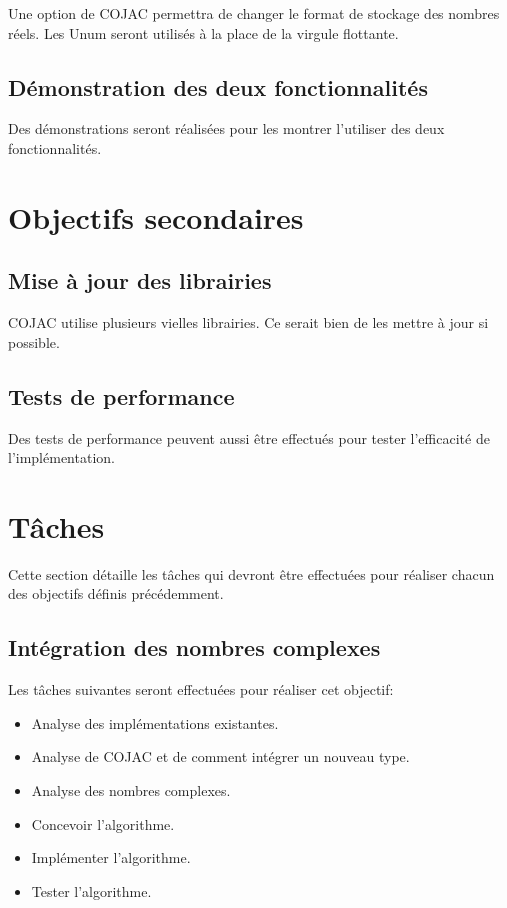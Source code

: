 Une option de COJAC permettra de changer le format de stockage des nombres réels. Les Unum seront utilisés à la place de la virgule flottante.

\subsection{Démonstration des deux fonctionnalités}

Des démonstrations seront réalisées pour les montrer l'utiliser des deux fonctionnalités.

\section{Objectifs secondaires}


\subsection{Mise à jour des librairies}

COJAC \cite{COJAC} utilise plusieurs vielles librairies. Ce serait bien de les mettre à jour si possible.

\subsection{Tests de performance}

Des tests de performance peuvent aussi être effectués pour tester l'efficacité de l'implémentation.

\section{Tâches}

Cette section détaille les tâches qui devront être effectuées pour réaliser chacun des objectifs définis précédemment.

\subsection{Intégration des nombres complexes}

Les tâches suivantes seront effectuées pour réaliser cet objectif:
\begin{itemize}
    \item Analyse des implémentations existantes.
    \item Analyse de COJAC et de comment intégrer un nouveau type.
    \item Analyse des nombres complexes.
    \item Concevoir l'algorithme.
    \item Implémenter l'algorithme.
    \item Tester l'algorithme.
\end{itemize}

